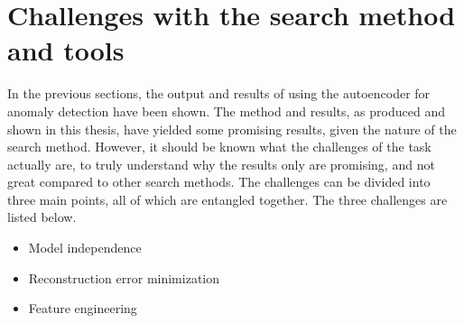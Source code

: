 \section{Challenges with the search method and tools}

In the previous sections, the output and results of using the autoencoder for anomaly detection have been shown. 
The method and results, as produced and shown in this thesis, have yielded some promising results, given the nature 
of the search method. However, it should be known what the challenges of the task actually are, to truly understand 
why the results only are promising, and not great compared to other search methods. The challenges can be divided into 
three main points, all of which are entangled together. The three challenges are listed below. 

\begin{itemize}
    \item Model independence
    \item Reconstruction error minimization
    \item Feature engineering
\end{itemize}

